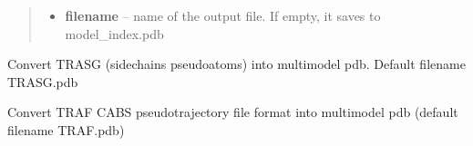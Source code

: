 \documentclass[letterpaper,10pt,english]{sphinxmanual}
\begin{document}
\begin{fulllineitems}
\begin{fulllineitems}
\begin{quote}
\begin{description}
\begin{itemize}
\item {} 
\textbf{filename} -- name of the output file. If empty, it saves to model\_index.pdb

\end{itemize}

\end{description}\end{quote}

\end{fulllineitems}


\begin{fulllineitems}
\label{api:pycabs.CABS.sgToPdb}
Convert TRASG (sidechains pseudoatoms) into multimodel pdb. Default filename TRASG.pdb

\end{fulllineitems}


\begin{fulllineitems}
\label{api:pycabs.CABS.trafToPdb}
Convert TRAF CABS pseudotrajectory file format into multimodel pdb (default filename TRAF.pdb)

\end{fulllineitems}


\end{fulllineitems}

\end{document}
